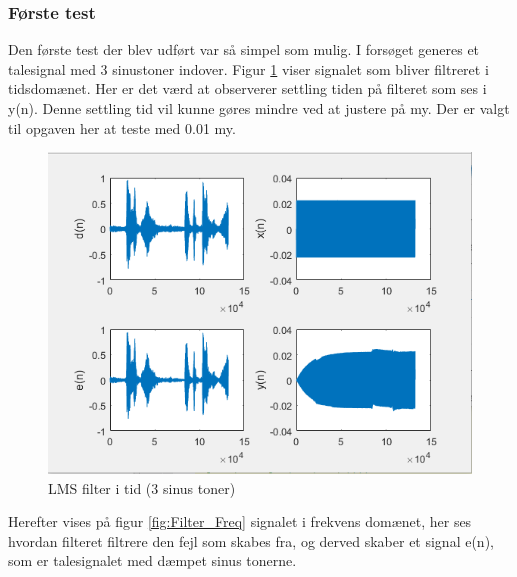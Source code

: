  
\newpage
\subsubsection{Første test}
Den første test der blev udført var så simpel som mulig. I forsøget generes et talesignal med 3 sinustoner indover. 
Figur \ref{fig:Filter_time} viser signalet som bliver filtreret i tidsdomænet. Her er det værd at observerer settling tiden på filteret som ses i y(n). Denne settling tid vil kunne gøres mindre ved at justere på my. Der er valgt til opgaven her at teste med 0.01 my. 
\begin{figure}[H]
	\centering
	\includegraphics[width = 400pt]{Img/Filter_time}
	\caption{LMS filter i tid (3 sinus toner)}
	\label{fig:Filter_time}
\end{figure}
\newpage
Herefter vises på figur \ref{fig:Filter_Freq} signalet i frekvens domænet, her ses hvordan filteret filtrere den fejl som skabes fra, og derved skaber et signal e(n), som er talesignalet med dæmpet sinus tonerne. 

